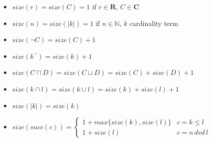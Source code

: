 \documentclass{book}
\theoremstyle{break}
\theoremstyle{definition}
\begin{document}
\begin{itemize}
\item $size(r)=size(C)=1$ if $r\in\mathbf{R}$, $C\in\mathbf{C}$
\item $size(n)=size(|k|)=1$ if $n\in\mathbb{N}$, $k$ cardinality term
\item $size(\neg C)=size(C)+1$
\item $size(k^\neg)=size(k)+1$
\item $size(C\sqcap D)=size(C\sqcup D)= size(C)+ size(D)+1$
\item $size(k\cap l)=size(k\cup l)= size(k)+ size(l)+1$
\item $size(|k|)=size(k)$
\item $size(succ(c))=\begin{cases}
1+max\{size(k),size(l)\} & c=k\leq l \\
1+size(l)& c= n\,dvd\,l
\end{cases}$
\end{itemize}
\end{document}

